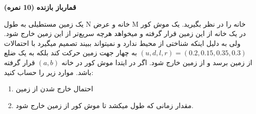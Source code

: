 \Large \textbf{قمارباز بازنده}
\large \textbf{(10 نمره)}

\normalsize \vspace{0.5cm}

یک زمین مستطیلی به طول N خانه و عرض M خانه را در نظر بگیرید. یک موش کور در یک خانه از این زمین قرار گرفته و میخواهد هرچه سریع‌تر از این زمین خارج شود. ولی به دلیل اینکه شناختی از محیط ندارد و نمیتواند ببیند تصمیم میگیرد با احتمالات
$\left( {u,d,l,r} \right) = \left( {0.2,0.15,0.35,0.3} \right)$
به چهار جهت زمین حرکت کند بلکه به یک ضلع از زمین برسد و از زمین خارج شود.
اگر در ایتدا موش کور در خانه
$\left( {a,b} \right)$
قرار گرفته باشد. موارد زیر را حساب کنید:

\begin{enumerate}[label=(\alph*)]
	
	\item
	احتمال خارج شدن از زمین
	\item
	مقدار زمانی که طول میکشد تا موش کور از زمین خارج شود.
	
\end{enumerate}
